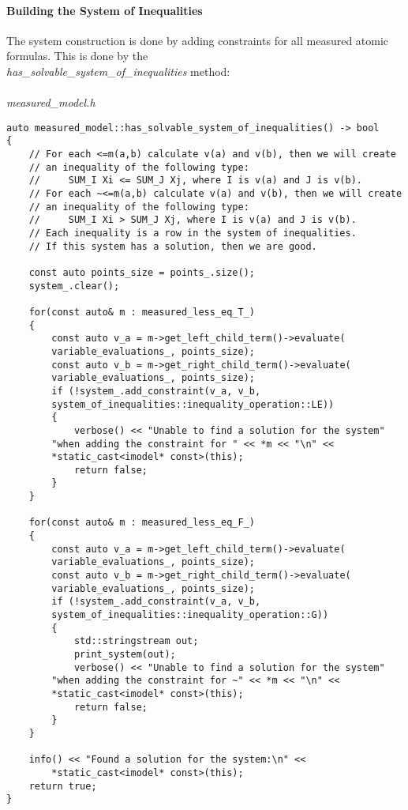 \documentclass{article}
\begin{document}
	\paragraph{Building the System of Inequalities}
	The system construction is done by adding constraints for all 	
	measured atomic formulas. This is done by the \\
	\textit{has\_solvable\_system\_of\_inequalities} method:
	\\
	\\
\noindent
\textit{measured\_model.h}
\begin{lstlisting}
auto measured_model::has_solvable_system_of_inequalities() -> bool
{
    // For each <=m(a,b) calculate v(a) and v(b), then we will create
    // an inequality of the following type: 
    //     SUM_I Xi <= SUM_J Xj, where I is v(a) and J is v(b).
    // For each ~<=m(a,b) calculate v(a) and v(b), then we will create
    // an inequality of the following type: 
    //     SUM_I Xi > SUM_J Xj, where I is v(a) and J is v(b).
    // Each inequality is a row in the system of inequalities. 
    // If this system has a solution, then we are good.

    const auto points_size = points_.size();
    system_.clear();

    for(const auto& m : measured_less_eq_T_)
    {
        const auto v_a = m->get_left_child_term()->evaluate(
		variable_evaluations_, points_size);
        const auto v_b = m->get_right_child_term()->evaluate(
		variable_evaluations_, points_size);
        if (!system_.add_constraint(v_a, v_b,
		system_of_inequalities::inequality_operation::LE))
        {
            verbose() << "Unable to find a solution for the system"
		"when adding the constraint for " << *m << "\n" << 
		*static_cast<imodel* const>(this);
            return false;
        }
    }

    for(const auto& m : measured_less_eq_F_)
    {
        const auto v_a = m->get_left_child_term()->evaluate(
		variable_evaluations_, points_size);
        const auto v_b = m->get_right_child_term()->evaluate(
		variable_evaluations_, points_size);
        if (!system_.add_constraint(v_a, v_b,
		system_of_inequalities::inequality_operation::G))
        {
            std::stringstream out;
            print_system(out);
            verbose() << "Unable to find a solution for the system"
		"when adding the constraint for ~" << *m << "\n" <<
		*static_cast<imodel* const>(this);
            return false;
        }
    }

    info() << "Found a solution for the system:\n" <<
		*static_cast<imodel* const>(this);
    return true;
}
\end{lstlisting}
\end{document}
